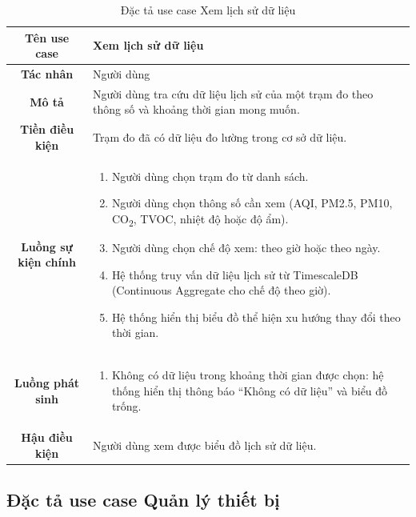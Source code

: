 \documentclass[../DoAn.tex]{subfiles}
\begin{document}
\begin{table}[H]
\centering
\caption{Đặc tả use case Xem lịch sử dữ liệu}
\label{table:uc_history}
\small
\begin{tabularx}{\textwidth}{|c|X|}
\hline
\textbf{Tên use case} & Xem lịch sử dữ liệu \\
\hline
\textbf{Tác nhân} & Người dùng \\
\hline
\textbf{Mô tả} & Người dùng tra cứu dữ liệu lịch sử của một trạm đo theo thông số và khoảng thời gian mong muốn. \\
\hline
\textbf{Tiền điều kiện} & Trạm đo đã có dữ liệu đo lường trong cơ sở dữ liệu. \\
\hline
\textbf{Luồng sự kiện chính} &
\begin{enumerate}[leftmargin=*, nosep]
    \item Người dùng chọn trạm đo từ danh sách.
    \item Người dùng chọn thông số cần xem (AQI, PM2.5, PM10, CO\textsubscript{2}, TVOC, nhiệt độ hoặc độ ẩm).
    \item Người dùng chọn chế độ xem: theo giờ hoặc theo ngày.
    \item Hệ thống truy vấn dữ liệu lịch sử từ TimescaleDB (Continuous Aggregate cho chế độ theo giờ).
    \item Hệ thống hiển thị biểu đồ thể hiện xu hướng thay đổi theo thời gian.
\end{enumerate} \\
\hline
\textbf{Luồng phát sinh} &
\begin{enumerate}[leftmargin=*, nosep]
    \item[4a.] Không có dữ liệu trong khoảng thời gian được chọn: hệ thống hiển thị thông báo ``Không có dữ liệu'' và biểu đồ trống.
\end{enumerate} \\
\hline
\textbf{Hậu điều kiện} & Người dùng xem được biểu đồ lịch sử dữ liệu. \\
\hline
\end{tabularx}
\end{table}

\subsection{Đặc tả use case Quản lý thiết bị}
\label{subsection:2.3.3}
\end{document}
